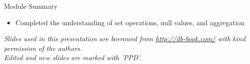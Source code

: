 \documentclass[aspectratio=169, xcolor=dvipsnames]{beamer}
\begin{document}
\begin{frame}{Module Summary}
    \begin{itemize}[<+->]
        \item Completed the understanding of set operations, null values, and aggregation
    \end{itemize}
    \vspace{2em}
    \begin{center}
    \small \textit{Slides used in this presentation are borrowed from \url{http://db-book.com/} with kind permission of the authors.} \\
    \small \textit{Edited and new slides are marked with 'PPD'.}
    \end{center}
\end{frame}
\end{document}
